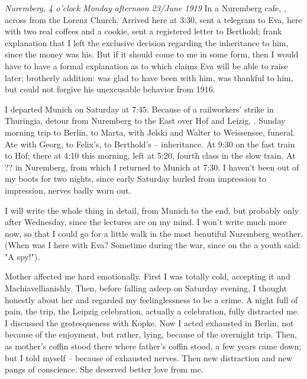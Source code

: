 
\textit{Nuremberg, 4 o'clock Monday afternoon 23/June 1919}
In a Nuremberg cafe, , across from the Lorenz Church. Arrived here at 3:30, sent a telegram to Eva, here with two real coffees and a cookie, sent a registered letter to Berthold; frank explanation that I left the exclusive decision regarding the inheritance to him, since the money was his. But if it should come to me in some form, then I would have to have a formal explanation as to which claims Eva will be able to raise later; brotherly addition: was glad to have been with him, was thankful to him, but could not forgive his unexcusable behavior from 1916.

I departed Munich on Saturday at 7:45. Because of a railworkers' strike in Thuringia, detour from Nuremberg to the East over Hof and Leizig. . Sunday morning trip to Berlin, to Marta, with Jelski and Walter to Weissensee, funeral. Ate with Georg, to Felix's, to Berthold's -- inheritance. At 9:30 on the fast train to Hof; there at 4:10 this morning, left at 5:20, fourth class in the slow train. At ?? in Nuremberg, from which I returned to Munich at 7:30. I haven't been out of my boots for two nights, since early Saturday hurled from impression to impression, nerves badly worn out.

I will write the whole thing in detail, from Munich to the end, but probably only after Wednesday, since the lectures are on my mind. I won't write much more now, so that I could go for a little walk in the most beautiful Nuremberg weather. (When was I here with Eva? Sometime during the war, since on the  a youth said: "A spy!").

Mother affected me hard emotionally. First I was totally cold, accepting it  and Machiavellianishly. Then, before falling asleep on Saturday evening, I thought honestly about her and regarded my feelinglessness to be a crime. A night full of pain, the trip, the Leipzig celebration, actually a celebration, fully distracted me. I discussed the grotesqueness with Kopke.  Now I acted exhausted in Berlin, not because of the enjoyment, but rather, lying, because of the overnight trip. Then, as mother's coffin stood there where father's coffin stood, a few years came down; but I told myself -- because of exhausted nerves. Then new distraction and new pangs of conscience. She deserved better love from me.

